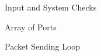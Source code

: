 \begin{figure}[p]
	\caption{\label{fig:prepare} Input and System Checks}
\end{figure}

\begin{figure}[p]
	\caption{\label{fig:ports} Array of Ports}
\end{figure}

\begin{figure}[p]
	\caption{\label{fig:loop} Packet Sending Loop}
\end{figure}

